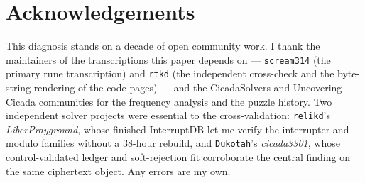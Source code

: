 \documentclass[11pt]{article}
\begin{document}
\section*{Acknowledgements}

This diagnosis stands on a decade of open community work. I thank the maintainers of the transcriptions this paper depends on --- \texttt{scream314} (the primary rune transcription) and \texttt{rtkd} (the independent cross-check and the byte-string rendering of the code pages) --- and the CicadaSolvers and Uncovering Cicada communities for the frequency analysis and the puzzle history. Two independent solver projects were essential to the cross-validation: \texttt{relikd}'s \emph{LiberPrayground}, whose finished InterruptDB let me verify the interrupter and modulo families without a 38-hour rebuild, and \texttt{Dukotah}'s \emph{cicada3301}, whose control-validated ledger and soft-rejection fit corroborate the central finding on the same ciphertext object. Any errors are my own.
\end{document}
